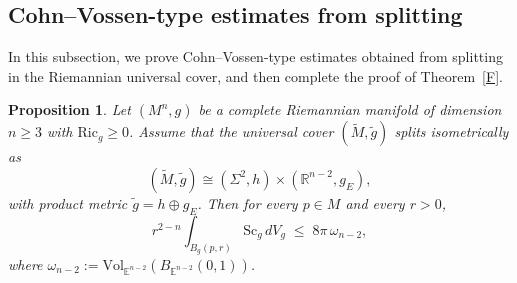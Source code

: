 \documentclass[12pt,oneside,a4paper]{article}
\newtheorem{proposition}[definition]{Proposition}
\theoremstyle{mytheorem}
\theoremstyle{remark}
\begin{document}
\subsection{Cohn--Vossen-type estimates from splitting}

In this subsection, we prove Cohn--Vossen-type estimates obtained from
splitting in the Riemannian universal cover, and then complete the proof of
Theorem~\ref{F}.



\begin{proposition}\label{codim2-splitting-Sc}
Let $(M^n,g)$ be a complete Riemannian manifold of dimension $n\ge 3$ with
$\mathrm{Ric}_g\ge 0$.
Assume that the universal cover $(\widetilde M,\widetilde g)$ splits
isometrically as
\[
(\widetilde M,\widetilde g)\cong (\Sigma^2,h)\times(\mathbb{R}^{n-2},g_E),
\]
with product metric $\widetilde g=h\oplus g_E$.
Then for every $p\in M$ and every $r>0$,
\[
r^{2-n}\int_{B_g(p,r)} \mathrm{Sc}_g\,dV_g \;\le\; 8\pi\,\omega_{n-2},
\]
where $\omega_{n-2}:=\mathrm{Vol}_{\mathbb{E}^{n-2}}(B_{\mathbb{E}^{n-2}}(0,1))$.
\end{proposition}
\end{document}
